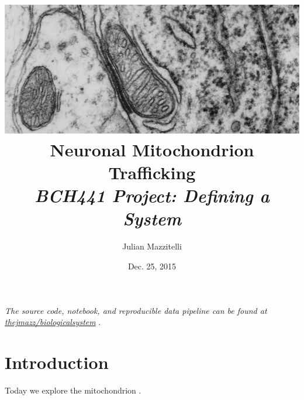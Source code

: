 

\hypersetup{
  colorlinks=true,
  linkcolor=black,
  citecolor=black,
  urlcolor=cyan
}

\usepackage[round]{natbib}




\title{
\vspace{-155pt}
\hspace*{-80pt}\includegraphics[width=1.35\linewidth]{"fig/purkinje-neuron-mitochondria"}
Neuronal Mitochondrion Trafficking \\
\small{\textit{BCH441 Project: Defining a System}}
}
\author{Julian Mazzitelli}
\date{Dec. 25, 2015}

\maketitle

\begin{center}
\textit{
The source code, notebook, and reproducible data pipeline can be found at
\href{https://github.com/thejmazz/biologicalsystem}{thejmazz/biologicalsystem}
}.
\end{center}

\section*{Introduction}

Today we explore the mitochondrion \citep{Reis2009}.







